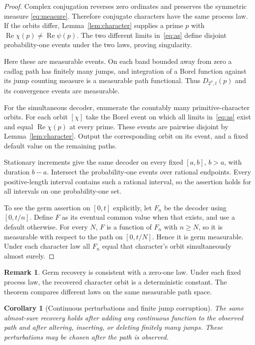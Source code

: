 \documentclass[11pt]{article}
\newtheorem{corollary}[theorem]{Corollary}
\theoremstyle{definition}
\newtheorem{remark}[theorem]{Remark}
\newcommand{\Rea}{\operatorname{Re}}
\newcommand{\orb}[1]{[#1]}
\begin{document}
\begin{proof}
Complex conjugation reverses zero ordinates and preserves the symmetric measure
\eqref{eq:measure}. Therefore conjugate characters have the same process law.
If the orbits differ, Lemma~\ref{lem:character} supplies a prime $p$ with
$\Rea\chi(p)\ne\Rea\psi(p)$. The two different limits in~\eqref{eq:as}
define disjoint probability-one events under the two laws, proving singularity.

Here these are measurable events. On each band bounded away from zero a
cadlag path has finitely many jumps, and integration of a Borel function against
its jump counting measure is a measurable path functional. Thus
$D_{2^n,t}(p)$ and its convergence events are measurable.

For the simultaneous decoder, enumerate the countably many primitive-character
orbits. For each orbit $\orb\chi$ take the Borel event on which all limits
in~\eqref{eq:as} exist and equal $\Rea\chi(p)$ at every prime. These events are
pairwise disjoint by Lemma~\ref{lem:character}. Output the corresponding orbit
on its event, and a fixed default value on the remaining paths.

Stationary increments give the same decoder on every fixed $[a,b]$, $b>a$,
with duration $b-a$. Intersect the probability-one events over rational
endpoints. Every positive-length interval contains such a rational interval,
so the assertion holds for all intervals on one probability-one set.

To see the germ assertion on $[0,t]$ explicitly, let $F_n$ be the decoder using
$[0,t/n]$. Define $F$ as its eventual common value when that exists, and use a
default otherwise. For every $N$, $F$ is a function of $F_n$ with $n\ge N$,
so it is measurable with respect to the path on $[0,t/N]$. Hence it is germ
measurable. Under each character law all $F_n$ equal that character's orbit
simultaneously almost surely.
\end{proof}

\begin{remark}
Germ recovery is consistent with a zero-one law. Under each fixed process law,
the recovered character orbit is a deterministic constant. The theorem compares
different laws on the same measurable path space.
\end{remark}

\begin{corollary}[Continuous perturbations and finite jump corruption]
\label{cor:robust}
The same almost-sure recovery holds after adding any continuous function to
the observed path and after altering, inserting, or deleting finitely many
jumps. These perturbations may be chosen after the path is observed.
\end{corollary}
\end{document}
